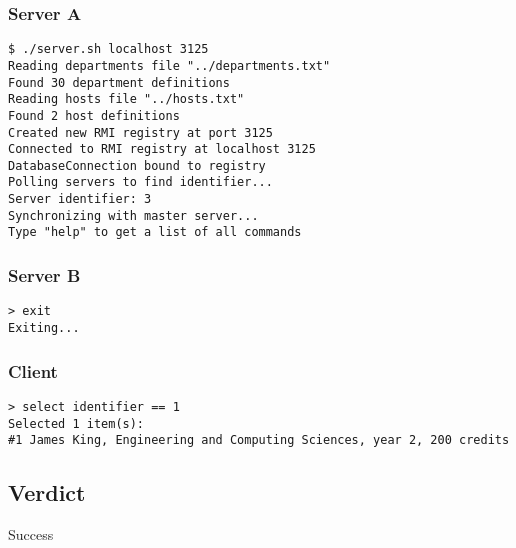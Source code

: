 \documentclass[a4paper,11pt]{article}
\begin{document}
\subsubsection{Server A}
\begin{verbatim}
$ ./server.sh localhost 3125
Reading departments file "../departments.txt"
Found 30 department definitions
Reading hosts file "../hosts.txt"
Found 2 host definitions
Created new RMI registry at port 3125
Connected to RMI registry at localhost 3125
DatabaseConnection bound to registry
Polling servers to find identifier...
Server identifier: 3
Synchronizing with master server...
Type "help" to get a list of all commands
\end{verbatim}

\subsubsection{Server B}
\begin{verbatim}
> exit
Exiting...
\end{verbatim}

\subsubsection{Client}
\begin{verbatim}
> select identifier == 1
Selected 1 item(s):
#1 James King, Engineering and Computing Sciences, year 2, 200 credits
\end{verbatim}

\subsection{Verdict}
Success
\end{document}
